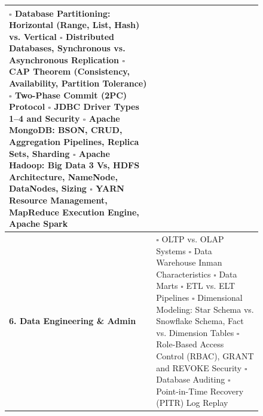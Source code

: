 \begin{figure}[htbp]
\begin{tabularx}{\textwidth}{l X}
$\square$ Database Partitioning: Horizontal (Range, List, Hash) vs. Vertical \newline
$\square$ Distributed Databases, Synchronous vs. Asynchronous Replication \newline
$\square$ CAP Theorem (Consistency, Availability, Partition Tolerance) \newline
$\square$ Two-Phase Commit (2PC) Protocol \quad $\square$ JDBC Driver Types 1--4 and Security \newline
$\square$ Apache MongoDB: BSON, CRUD, Aggregation Pipelines, Replica Sets, Sharding \newline
$\square$ Apache Hadoop: Big Data 3 Vs, HDFS Architecture, NameNode, DataNodes, Sizing \newline
$\square$ YARN Resource Management, MapReduce Execution Engine, Apache Spark \\
\midrule
\textbf{6. Data Engineering \& Admin} & $\square$ OLTP vs. OLAP Systems \quad $\square$ Data Warehouse Inman Characteristics \newline
$\square$ Data Marts \quad $\square$ ETL vs. ELT Pipelines \newline
$\square$ Dimensional Modeling: Star Schema vs. Snowflake Schema, Fact vs. Dimension Tables \newline
$\square$ Role-Based Access Control (RBAC), GRANT and REVOKE Security \newline
$\square$ Database Auditing \quad $\square$ Point-in-Time Recovery (PITR) Log Replay \\
\bottomrule
\end{tabularx}
\end{figure}
